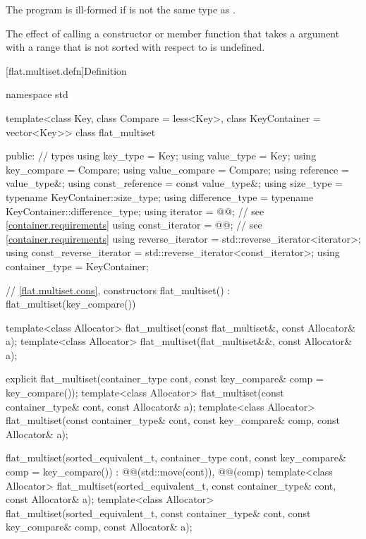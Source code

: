 \pnum
The program is ill-formed if  is not the same type
as .

\pnum
The effect of calling a constructor or member function
that takes a  argument with a range
that is not sorted with respect to  is undefined.

[flat.multiset.defn]{Definition}

\begin{codeblock}
namespace std {
  template<class Key, class Compare = less<Key>, class KeyContainer = vector<Key>>
  class flat_multiset {
  public:
    // types
    using key_type                  = Key;
    using value_type                = Key;
    using key_compare               = Compare;
    using value_compare             = Compare;
    using reference                 = value_type&;
    using const_reference           = const value_type&;
    using size_type                 = typename KeyContainer::size_type;
    using difference_type           = typename KeyContainer::difference_type;
    using iterator                  = @@;  // see \ref{container.requirements}
    using const_iterator            = @@;  // see \ref{container.requirements}
    using reverse_iterator          = std::reverse_iterator<iterator>;
    using const_reverse_iterator    = std::reverse_iterator<const_iterator>;
    using container_type            = KeyContainer;

    // \ref{flat.multiset.cons}, constructors
    flat_multiset() : flat_multiset(key_compare()) { }

    template<class Allocator>
      flat_multiset(const flat_multiset&, const Allocator& a);
    template<class Allocator>
      flat_multiset(flat_multiset&&, const Allocator& a);

    explicit flat_multiset(container_type cont, const key_compare& comp = key_compare());
    template<class Allocator>
      flat_multiset(const container_type& cont, const Allocator& a);
    template<class Allocator>
      flat_multiset(const container_type& cont, const key_compare& comp, const Allocator& a);

    flat_multiset(sorted_equivalent_t, container_type cont,
                  const key_compare& comp = key_compare())
      : @@(std::move(cont)), @@(comp) { }
    template<class Allocator>
      flat_multiset(sorted_equivalent_t, const container_type& cont, const Allocator& a);
    template<class Allocator>
      flat_multiset(sorted_equivalent_t, const container_type& cont,
                    const key_compare& comp, const Allocator& a);

}}
\end{codeblock}
